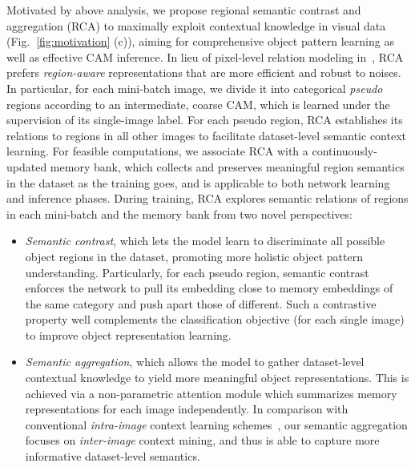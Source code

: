 \documentclass[10pt,twocolumn,letterpaper]{article}
\begin{document}
Motivated by above analysis, we propose regional semantic contrast and aggregation (RCA) to maximally exploit  contextual knowledge in visual data (Fig.$_{\!}$~\ref{fig:motivation} (c)), aiming for comprehensive object pattern learning as well as effective CAM inference. In lieu of pixel-level relation modeling in~\cite{fan2020cian,sun2020mining,zhou2021group},  RCA prefers \emph{region-aware} representations that are more efficient and robust to noises. In particular, for each mini-batch image, we divide it into categorical  \emph{pseudo} regions according to an intermediate, coarse CAM, which is learned under the supervision of its single-image label. For each pseudo region, RCA establishes  its relations  to regions in all other images to facilitate dataset-level semantic context learning. For feasible computations, we associate RCA with a continuously-updated memory bank, which collects and preserves meaningful region semantics in the dataset as the training goes, and is applicable to both network learning and inference phases. During training, RCA explores semantic relations of regions in each mini-batch and the memory bank from two novel perspectives:
\begin{itemize}[leftmargin=*]
	\setlength{\itemsep}{0pt}
	\setlength{\parsep}{-2pt}
	\setlength{\parskip}{-0pt}
	\setlength{\leftmargin}{-8pt}
\vspace{-4pt}\item \textit{Semantic contrast}, which lets the model learn to discriminate all possible object regions in the dataset, promoting more holistic object pattern understanding. Particularly, for each pseudo region, {semantic contrast} enforces the network to pull its embedding close to memory embeddings of the same category and push apart those of different. Such a contrastive property well complements the classification objective (for each single image) to improve object representation learning.
	
	\item  \textit{Semantic aggregation}, which allows the model to gather dataset-level  contextual knowledge to yield more meaningful object representations. This is achieved via a non-parametric attention module which  summarizes memory representations  for each  image independently. In comparison with conventional \textit{intra-image} context learning schemes~\cite{chen20182,yuan2020object}, our semantic aggregation focuses on  \textit{inter-image}  context mining, and thus is able to capture more informative dataset-level semantics.
	

	
	\vspace{-4pt}
\end{itemize}
\end{document}
